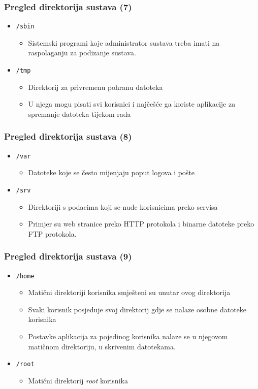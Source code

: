 \documentclass{beamer}
\begin{document}
\begin{frame}[t]
\frametitle{Pregled direktorija sustava (7)}
\begin{itemize}
  \item \texttt{/sbin}
  \begin{itemize}
    \item Sistemski programi koje administrator sustava treba imati na
          raspolaganju za podizanje sustava.
  \end{itemize}
  \item \texttt{/tmp}
  \begin{itemize}
    \item Direktorij za privremenu pohranu datoteka
    \item U njega mogu pisati svi korisnici i najčešće ga koriste
          aplikacije za spremanje datoteka tijekom rada
  \end{itemize}
\end{itemize}
\end{frame}

\begin{frame}[t]
\frametitle{Pregled direktorija sustava (8)}
\begin{itemize}
  \item \texttt{/var}
  \begin{itemize}
    \item Datoteke koje se često mijenjaju poput logova i pošte
  \end{itemize}
  \item \texttt{/srv}
  \begin{itemize}
    \item Direktoriji s podacima koji se nude korisnicima preko servisa
    \item Primjer su web stranice preko HTTP protokola i binarne datoteke
          preko FTP protokola.
  \end{itemize}
\end{itemize}
\end{frame}

\begin{frame}[t]
\frametitle{Pregled direktorija sustava (9)}
\begin{itemize}
  \item \texttt{/home}
  \begin{itemize}
    \item Matični direktoriji korisnika smješteni su unutar ovog
          direktorija
    \item Svaki korisnik posjeduje svoj direktorij gdje se nalaze osobne
          datoteke korisnika
    \item Postavke aplikacija za pojedinog korisnika nalaze se u njegovom
          matičnom direktoriju, u skrivenim datotekama.
  \end{itemize}
  \item \texttt{/root}
  \begin{itemize}
    \item Matični direktorij \emph{root} korisnika
  \end{itemize}
\end{itemize}
\end{frame}
\end{document}
